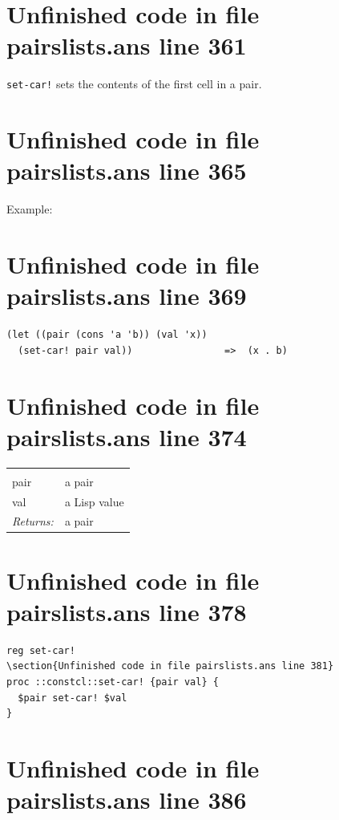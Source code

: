 \documentclass[twoside,9pt]{report}
\begin{document}
\section{Unfinished code in file pairslists.ans line 361}


\texttt{set-car!} sets the contents of the first cell in a pair.

\section{Unfinished code in file pairslists.ans line 365}


Example:

\section{Unfinished code in file pairslists.ans line 369}
\begin{verbatim}
(let ((pair (cons 'a 'b)) (val 'x))
  (set-car! pair val))                =>  (x . b)
\end{verbatim}
\section{Unfinished code in file pairslists.ans line 374}
\noindent\begin{tabular}{ |p{1.9cm} p{8cm}| }
\hline
\rowcolor[HTML]{CCCCCC} \multicolumn{2}{|l|}{\bf set-car! (public)} \\
pair & a pair \\
val & a Lisp value \\
\textit{Returns:} & a pair \\
\hline
\end{tabular}
\section{Unfinished code in file pairslists.ans line 378}
\begin{lstlisting}
reg set-car!
\section{Unfinished code in file pairslists.ans line 381}
proc ::constcl::set-car! {pair val} {
  $pair set-car! $val
}
\end{lstlisting}
\section{Unfinished code in file pairslists.ans line 386}
\end{document}
